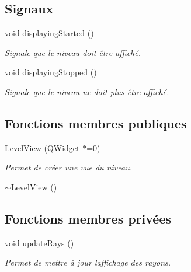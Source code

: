 \subsection*{Signaux}
\begin{DoxyCompactItemize}
\item 
void \hyperlink{classLevelView_a3953bf386139bae926640e8c9e90b5fe}{displaying\+Started} ()
\begin{DoxyCompactList}\small\item\em Signale que le niveau doit être affiché. \end{DoxyCompactList}\item 
void \hyperlink{classLevelView_a4e35d1b0b0fa00a1a4c602da15471359}{displaying\+Stopped} ()
\begin{DoxyCompactList}\small\item\em Signale que le niveau ne doit plus être affiché. \end{DoxyCompactList}\end{DoxyCompactItemize}
\subsection*{Fonctions membres publiques}
\begin{DoxyCompactItemize}
\item 
\hyperlink{classLevelView_a1537183269cd26f8341f7e2eb80545d3}{Level\+View} (Q\+Widget $\ast$=0)
\begin{DoxyCompactList}\small\item\em Permet de créer une vue du niveau. \end{DoxyCompactList}\item 
\hyperlink{classLevelView_a8a68c0e4a47fc91422c2d1a22c735ea4}{$\sim$\+Level\+View} ()
\end{DoxyCompactItemize}
\subsection*{Fonctions membres privées}
\begin{DoxyCompactItemize}
\item 
void \hyperlink{classLevelView_a253e8066d8b1cd5c02f6f752b6497462}{update\+Rays} ()
\begin{DoxyCompactList}\small\item\em Permet de mettre à jour l\textquotesingle{}affichage des rayons. \end{DoxyCompactList}\end{DoxyCompactItemize}
